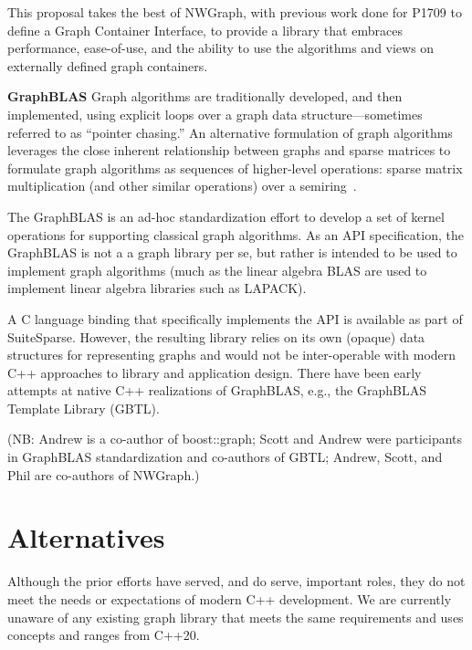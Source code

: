 This proposal takes the best of NWGraph, with previous work done for P1709 to define a Graph Container Interface, to provide a library that
embraces performance, ease-of-use, and the ability to use the algorithms and views on externally defined graph containers.

\medskip

\textbf{GraphBLAS}
Graph algorithms are traditionally developed, and then implemented, using explicit loops
over a graph data structure---sometimes referred to as ``pointer chasing.''
An alternative formulation of graph algorithms leverages the close inherent relationship between
graphs and sparse matrices to formulate graph algorithms as sequences of higher-level operations:
sparse matrix multiplication (and other similar operations) over a semiring~\cite{kepner-gilbert}.

The GraphBLAS is an ad-hoc
standardization effort to develop a set of kernel operations for supporting classical
graph algorithms.  As an API specification, the GraphBLAS is not a a graph library per se, 
but rather is intended to be
used to implement graph algorithms (much as the linear algebra BLAS are used  to implement
linear algebra libraries such as LAPACK).

A C language binding that specifically implements the API is available as part of SuiteSparse.
However, the resulting library relies on its own (opaque) data structures for representing graphs
and would not be inter-operable with modern C++ approaches to library and application design.
There have been early attempts at native C++ realizations of GraphBLAS, e.g., the
GraphBLAS Template Library (GBTL).

(NB: Andrew is a co-author of boost::graph; 
Scott and Andrew were participants in GraphBLAS standardization
and co-authors of GBTL; Andrew, Scott, and Phil are 
co-authors of NWGraph.)

\section{Alternatives}
Although the prior efforts have served, and do serve, important roles,
they do not meet the needs or expectations of modern C++ development.
We are currently
unaware of any existing graph
library that meets the same requirements and uses concepts and ranges from C++20.

